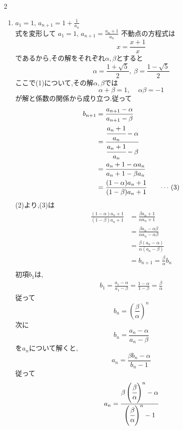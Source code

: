 \documentclass[dvipdfmx,a4paper,11pt,fleqn,openany]{jsbook}
\begin{document}
\begin{multicols*}{2}
\begin{enumerate}[label=(\arabic*),parsep=3pt]
        \item $\displaystyle a_1=1,\, a_{n+1}=1+\frac{1}{a_n}$\\
              式を変形して
              $\displaystyle a_1=1,\, a_{n+1}=\frac{a_n+1}{a_n}$
              不動点の方程式は
              \[
                x=\frac{x+1}{x}\tag*{\(\cdots\) (1)}
              \]
              であるから,その解をそれぞれ$\alpha,\beta$とすると
              \[
                \alpha=\frac{1+\sqrt{5}}{2},\ \beta=\frac{1-\sqrt{5}}{2}
              \]
              ここで(1)について,その解$\alpha,\beta$では
              \[
                \alpha+\beta=1,\, \quad \alpha\beta=-1\tag*{\(\cdots\) (2)}
              \]
              が解と係数の関係から成り立つ.従って
              \begin{align*}
                b_{n+1}&=\frac{a_{n+1}-\alpha}{a_{n+1}-\beta}\\
                &=\cfrac{\cfrac{a_n+1}{a_n}-\alpha}{\cfrac{a_n+1}{a_n}-\beta}\\
                &=\frac{a_n+1-\alpha a_n}{a_n+1-\beta a_n}\\
                &=\frac{(1-\alpha)a_n+1}{(1-\beta)a_n+1}\tag*{\(\cdots\) (3)}
              \end{align*}
              (2)より,(3)は
              \begin{align*}
                \frac{(1-\alpha)a_n+1}{(1-\beta)a_n+1}&=\frac{\beta a_n+1}{\alpha a_n+1}\\
                &=\frac{\beta a_n-\alpha\beta}{\alpha a_n-\alpha\beta}\\
                &=\frac{\beta (a_n-\alpha)}{\alpha (a_n-\beta)}\\
                &=b_{n+1}=\frac{\beta}{\alpha}b_n\\
              \end{align*}
              初項$b_1$は,
              \begin{align*}
                b_1=\frac{a_1-\alpha}{a_1-\beta}=\frac{1-\alpha}{1-\beta}=\frac{\beta}{\alpha}
              \end{align*}
              従って
              \[
                b_n=\left(\frac{\beta}{\alpha}\right)^n
              \]
              次に
              \[
                b_{n}=\frac{a_{n}-\alpha}{a_{n}-\beta}
              \]
              を$a_n$について解くと,
              \[
                a_{n}=\frac{\beta b_{n}-\alpha}{b_{n}-1}
              \]
              従って
              \begin{align*}
                a_{n}&=\cfrac{\beta \left(\cfrac{\beta}{\alpha}\right)^n-\alpha}{\left(\cfrac{\beta}{\alpha}\right)^n-1}  \\

\end{align*}
\end{enumerate}
\end{multicols*}
\end{document}
